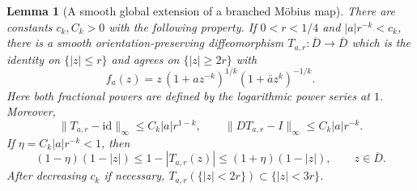 \documentclass[11pt,a4paper]{article}
\numberwithin{equation}{section}
\newtheorem{lemma}[theorem]{Lemma}
\theoremstyle{definition}
\theoremstyle{remark}
\begin{document}
\begin{lemma}[A smooth global extension of a branched M\"obius map]
\label{lem:patched-lift}
There are constants $c_k,C_k>0$ with the following property. If
$0<r<1/4$ and $|a|r^{-k}<c_k$, there is a smooth orientation-preserving
diffeomorphism $T_{a,r}:\overline D\to\overline D$ which is the identity
on $\{|z|\leq r\}$ and agrees on $\{|z|\geq 2r\}$ with
\begin{equation}
 f_a(z)=z\,(1+a z^{-k})^{1/k}(1+\bar a z^k)^{-1/k}.
 \label{eq:lift-map}
\end{equation}
Here both fractional powers are defined by the logarithmic power series
at $1$. Moreover,
\begin{equation}
 \|T_{a,r}-\mathrm{id}\|_\infty\leq C_k|a|r^{1-k},\qquad
 \|D T_{a,r}-I\|_\infty\leq C_k|a|r^{-k}.
 \label{eq:patched-c1}
\end{equation}
If $\eta=C_k|a|r^{-k}<1$, then
\begin{equation}
 (1-\eta)(1-|z|)\leq 1-|T_{a,r}(z)|
 \leq(1+\eta)(1-|z|),\qquad z\in\overline D.
 \label{eq:distance-boundary}
\end{equation}
After decreasing $c_k$ if necessary,
$T_{a,r}(\{|z|<2r\})\subset\{|z|<3r\}$.
\end{lemma}
\end{document}
